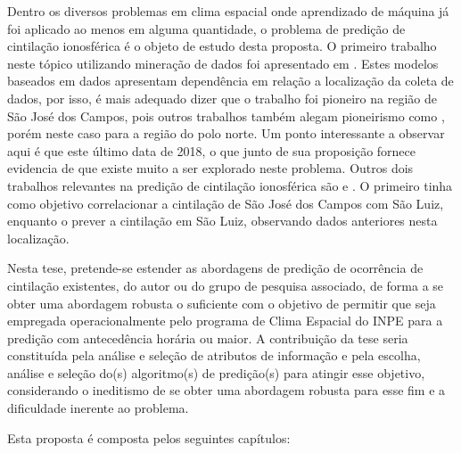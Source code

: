 Dentro os diversos problemas em clima espacial onde aprendizado de máquina já foi aplicado ao menos em alguma quantidade, o problema de predição de cintilação ionosférica é o objeto de estudo desta proposta. O primeiro trabalho neste tópico utilizando mineração de dados foi apresentado em \cite{REZENDE:2009, REZENDE:2010}. Estes modelos baseados em dados apresentam dependência em relação a localização da coleta de dados, por isso, é mais adequado dizer que o trabalho \cite{REZENDE:2009, REZENDE:2010} foi pioneiro na região de São José dos Campos, pois outros trabalhos também alegam pioneirismo como \cite{MCGRANAGHAN:2018}, porém neste caso para a região do polo norte. Um ponto interessante a observar aqui é que este último data de 2018, o que junto de sua proposição fornece evidencia de que existe muito a ser explorado neste problema. Outros dois trabalhos relevantes na predição de cintilação ionosférica são \cite{GLAUSTON:2014} e \cite{GLAUSTON:2015}. O primeiro tinha como objetivo correlacionar a cintilação de São José dos Campos com São Luiz, enquanto o prever a cintilação em São Luiz, observando dados anteriores nesta localização.

Nesta tese, pretende-se estender as abordagens de predição de ocorrência de cintilação existentes, do autor ou do grupo de pesquisa associado, de forma a se obter uma abordagem robusta o suficiente com o objetivo de permitir que seja empregada operacionalmente pelo programa de Clima Espacial do INPE para a predição com antecedência horária ou maior. A contribuição da tese seria constituída pela análise e seleção de atributos de informação e pela escolha, análise e seleção do(s) algoritmo(s) de predição(s) para atingir esse objetivo, considerando o ineditismo de se obter uma abordagem robusta para esse fim e a dificuldade inerente ao problema.

Esta proposta é composta pelos seguintes capítulos:

